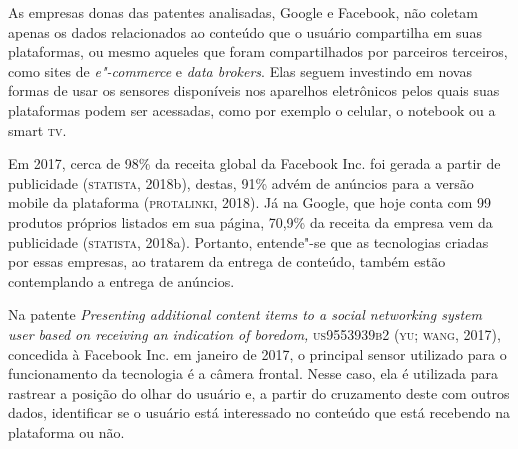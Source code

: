 As empresas donas das patentes analisadas, Google e Facebook, não
coletam apenas os dados relacionados ao conteúdo que o usuário
compartilha em suas plataformas, ou mesmo aqueles que foram
compartilhados por parceiros terceiros, como sites de \emph{e"-commerce}
e \emph{data brokers}. Elas seguem investindo em novas formas de usar os
sensores disponíveis nos aparelhos eletrônicos pelos quais suas
plataformas podem ser acessadas, como por exemplo o celular, o notebook
ou a smart \textsc{tv}.

Em 2017, cerca de 98\% da receita global da Facebook Inc. foi gerada a
partir de publicidade (\textsc{statista}, 2018b), destas, 91\% advém de anúncios
para a versão mobile da plataforma (\textsc{protalinki}, 2018). Já na Google, que
hoje conta com 99 produtos próprios listados em sua página, 70,9\% da
receita da empresa vem da publicidade (\textsc{statista}, 2018a). Portanto,
entende"-se que as tecnologias criadas por essas empresas, ao tratarem da
entrega de conteúdo, também estão contemplando a entrega de anúncios.

Na patente \emph{Presenting additional content items to a social
networking system user based on receiving an indication of boredom,}
\textsc{us9553939b2} (\textsc{yu; wang}, 2017), concedida à Facebook Inc. em janeiro de
2017, o principal sensor utilizado para o funcionamento da tecnologia é
a câmera frontal. Nesse caso, ela é utilizada para rastrear a posição do
olhar do usuário e, a partir do cruzamento deste com outros dados,
identificar se o usuário está interessado no conteúdo que está recebendo
na plataforma ou não.

